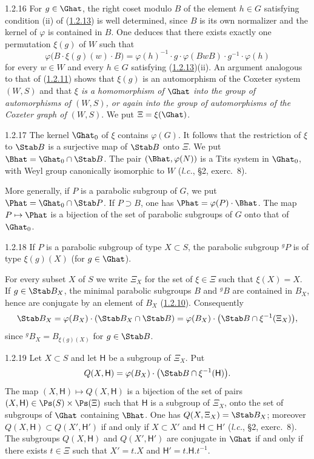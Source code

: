 \documentclass[12pt,a4paper,oneside,english]{smfart}
\makeatletter
\newcommand{\btanchor}[1]{\leavevmode\Hy@raisedlink{\hypertarget{bt:#1}{}}}
\newcommand{\btref}[1]{\hyperlink{bt:#1}{#1}}
\theoremstyle{definition}
\theoremstyle{bt}
\makeatother
\begin{document}
\num{1.2.16}\btanchor{1.2.16} For $g\in\Ghat$, the right coset modulo $B$ of the element
$h\in G$ satisfying condition (ii) of (\btref{1.2.13}) is well determined, since $B$ is its own normalizer and the kernel of $\varphi$ is contained in $B$. One deduces that there exists exactly one permutation $\xi(g)$ of $W$ such that
\[
  \varphi\bigl(B\cdot\xi(g)(w)\cdot B\bigr)
   =\varphi(h)^{-1}\cdot g\cdot\varphi(BwB)\cdot g^{-1}\cdot\varphi(h)
\]
for every $w\in W$ and every $h\in G$ satisfying (\btref{1.2.13})(ii). An argument analogous to that of (\btref{1.2.11}) shows that $\xi(g)$ is an automorphism of the Coxeter system $(W,S)$ and that \emph{$\xi$ is a homomorphism of $\Ghat$ into the group of automorphisms of $(W,S)$, or again into the group of automorphisms of the Coxeter graph of $(W,S)$}. We put $\Xi=\xi(\Ghat)$.

\num{1.2.17}\btanchor{1.2.17} The kernel $\Ghat_0$ of $\xi$ contains $\varphi(G)$. It follows
that the restriction of $\xi$ to $\Stab B$ is a surjective map of $\Stab B$ onto $\Xi$. We put $\Bhat=\Ghat_0\cap\Stab B$. The pair $(\Bhat,\varphi(N))$ is a Tits system in $\Ghat_0$, with Weyl group canonically isomorphic to $W$ (\emph{l.c.}, \S2, exerc.~8).

More generally, if $P$ is a parabolic subgroup of $G$, we put $\Phat=\Ghat_0\cap\Stab P$. If $P\supset B$, one has $\Phat=\varphi(P)\cdot\Bhat$. The map $P\mapsto\Phat$ is a bijection of the set of parabolic subgroups of $G$ onto that of $\Ghat_0$.

\num{1.2.18}\btanchor{1.2.18} If $P$ is a parabolic subgroup of type $X\subset S$, the
parabolic subgroup $^{g}P$ is of type $\xi(g)(X)$ (for $g\in\Ghat$).

For every subset $X$ of $S$ we write $\Xi_X$ for the set of $\xi\in\Xi$ such that $\xi(X)=X$. If $g\in\Stab B_X$, the minimal parabolic subgroups $B$ and $^{g}B$ are contained in $B_X$, hence are conjugate by an element of $B_X$ (\btref{1.2.10}). Consequently
\[
  \Stab B_X=\varphi(B_X)\cdot(\Stab B_X\cap\Stab B)
          =\varphi(B_X)\cdot\bigl(\Stab B\cap\xi^{-1}(\Xi_X)\bigr),
\]
since $^{g}B_X=B_{\xi(g)(X)}$ for $g\in\Stab B$.

\num{1.2.19}\btanchor{1.2.19} Let $X\subset S$ and let $\mathsf{H}$ be a subgroup of $\Xi_X$.
Put
\[
  Q(X,\mathsf{H})=\varphi(B_X)\cdot\bigl(\Stab B\cap\xi^{-1}(\mathsf{H})\bigr).
\]
The map $(X,\mathsf{H})\mapsto Q(X,\mathsf{H})$ is a bijection of the set of pairs $(X,\mathsf{H})\in\Ps(S)\times\Ps(\Xi)$ such that $\mathsf{H}$ is a subgroup of $\Xi_X$, onto the set of subgroups of $\Ghat$ containing $\Bhat$. One has $Q(X,\Xi_X)=\Stab B_X$; moreover $Q(X,\mathsf{H})\subset Q(X',\mathsf{H}')$ if and only if $X\subset X'$ and $\mathsf{H}\subset\mathsf{H}'$ (\emph{l.c.}, \S2, exerc.~8). The subgroups $Q(X,\mathsf{H})$ and $Q(X',\mathsf{H}')$ are conjugate in $\Ghat$ if and only if there exists $t\in\Xi$ such that $X'=t.X$ and $\mathsf{H}'=t.\mathsf{H}.t^{-1}$.
\end{document}
